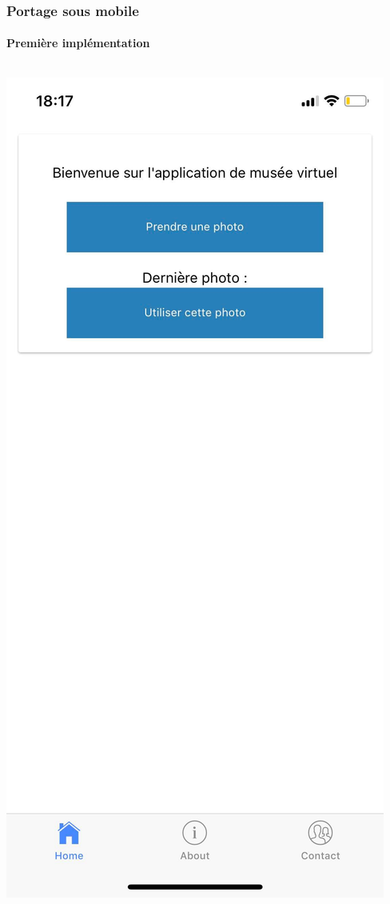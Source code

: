         \begin{frame}
            \frametitle{Portage sous mobile}
            \framesubtitle{Première implémentation}
            \begin{columns}
                \begin{column}{.33\linewidth}
                    \includegraphics[width=\linewidth]{./rsc/appli_1.png}

\end{column}
\end{columns}
\end{frame}
